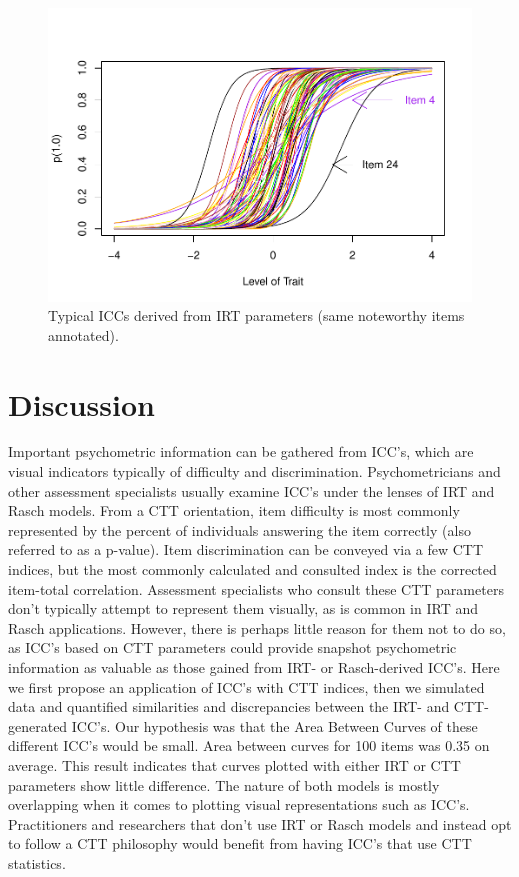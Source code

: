 \documentclass[
  man]{apa6}
\begin{document}
\begin{figure}
\centering
\includegraphics{SIOP_files/figure-latex/irtcurves-1.pdf}
\caption{\label{fig:irtcurves}Typical ICCs derived from IRT parameters (same noteworthy items annotated).}
\end{figure}

\hypertarget{discussion}{%
\section{Discussion}\label{discussion}}

Important psychometric information can be gathered from ICC's, which are visual indicators typically of difficulty and discrimination. Psychometricians and other assessment specialists usually examine ICC's under the lenses of IRT and Rasch models. From a CTT orientation, item difficulty is most commonly represented by the percent of individuals answering the item correctly (also referred to as a p-value). Item discrimination can be conveyed via a few CTT indices, but the most commonly calculated and consulted index is the corrected item-total correlation. Assessment specialists who consult these CTT parameters don't typically attempt to represent them visually, as is common in IRT and Rasch applications. However, there is perhaps little reason for them not to do so, as ICC's based on CTT parameters could provide snapshot psychometric information as valuable as those gained from IRT- or Rasch-derived ICC's. Here we first propose an application of ICC's with CTT indices, then we simulated data and quantified similarities and discrepancies between the IRT- and CTT-generated ICC's. Our hypothesis was that the Area Between Curves of these different ICC's would be small. Area between curves for 100 items was 0.35 on average. This result indicates that curves plotted with either IRT or CTT parameters show little difference. The nature of both models is mostly overlapping when it comes to plotting visual representations such as ICC's. Practitioners and researchers that don't use IRT or Rasch models and instead opt to follow a CTT philosophy would benefit from having ICC's that use CTT statistics.
\end{document}
